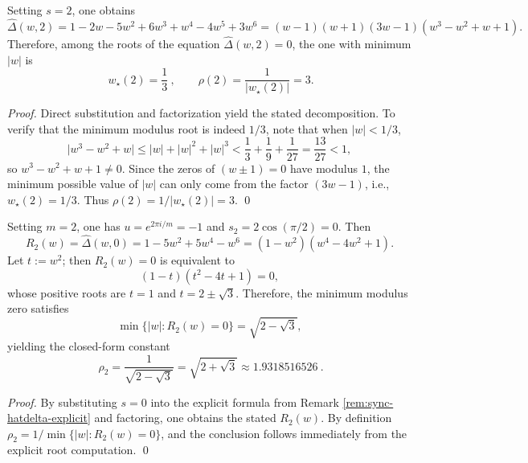 \begin{corollary}[Closed-form factorization and minimum modulus root at the endpoint \(u=1\) (\(s=2\))]\label{cor:sync-hatdelta-s2-factorization}
Setting \(s=2\), one obtains
\[
\widehat\Delta(w,2)
=1-2w-5w^2+6w^3+w^4-4w^5+3w^6
=(w-1)(w+1)(3w-1)(w^3-w^2+w+1).
\]
Therefore, among the roots of the equation \(\widehat\Delta(w,2)=0\), the one with minimum \(|w|\) is
\[
\boxed{\ w_\star(2)=\frac13\ },\qquad \rho(2)=\frac{1}{|w_\star(2)|}=3.
\]
\end{corollary}
\begin{proof}
Direct substitution and factorization yield the stated decomposition.
To verify that the minimum modulus root is indeed \(1/3\), note that when \(|w|<1/3\),
\[
\bigl|w^3-w^2+w\bigr|
\le |w|+|w|^2+|w|^3
<\frac13+\frac19+\frac1{27}
=\frac{13}{27}<1,
\]
so \(w^3-w^2+w+1\neq 0\). Since the zeros of \((w\pm 1)=0\) have modulus \(1\), the minimum possible value of \(|w|\) can only come from the factor \((3w-1)\), i.e., \(w_\star(2)=1/3\).
Thus \(\rho(2)=1/|w_\star(2)|=3\). \qed
\end{proof}

\begin{corollary}[Closed-form spectral radius for the worst-case twist \(m=2\)]\label{cor:sync-rho-m2-closed-form}
Setting \(m=2\), one has \(u=e^{2\pi i/m}=-1\) and
\(
s_2=2\cos(\pi/2)=0
\).
Then
\[
R_2(w)=\widehat\Delta(w,0)=1-5w^2+5w^4-w^6=(1-w^2)(w^4-4w^2+1).
\]
Let \(t:=w^2\); then \(R_2(w)=0\) is equivalent to
\[
(1-t)(t^2-4t+1)=0,
\]
whose positive roots are \(t=1\) and \(t=2\pm\sqrt3\). Therefore, the minimum modulus zero satisfies
\[
\min\{|w|:R_2(w)=0\}=\sqrt{2-\sqrt3},
\]
yielding the closed-form constant
\[
\boxed{\ \rho_2=\frac{1}{\sqrt{2-\sqrt3}}=\sqrt{2+\sqrt3}\approx 1.9318516526\ }.
\]
\end{corollary}
\begin{proof}
By substituting \(s=0\) into the explicit formula from Remark \ref{rem:sync-hatdelta-explicit} and factoring, one obtains the stated \(R_2(w)\).
By definition
\(
\rho_2=1/\min\{|w|:R_2(w)=0\}
\),
and the conclusion follows immediately from the explicit root computation. \qed
\end{proof}

